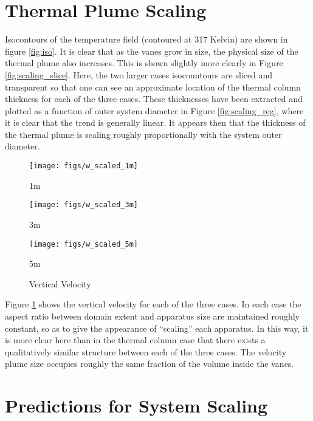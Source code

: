 \documentclass[english]{article}
\begin{document}
\section*{Thermal Plume Scaling}

Isocontours of the temperature field (contoured at 317 Kelvin) are shown in figure \ref{fig:iso}. 
It is clear that as the vanes grow in size, the physical size of the thermal plume also increases. This is shown slightly more clearly in
 Figure \ref{fig:scaling_slice}. Here, the two larger cases isocountours are sliced and transparent so that one can see an approximate 
location of the thermal column thickness for each of the three cases. These thicknesses have been extracted and plotted as a 
function of outer system diameter in Figure \ref{fig:scaling_reg}, where it is clear that the trend is generally linear. It appears then that 
the thickness of the thermal plume is scaling roughly proportionally with the system outer diameter. 

%
%


\begin{figure}[!htb]
\texttt{[image: figs/w\_scaled\_1m]}
\caption*{1m}\label{fig:1m_vz}
\endminipage\hfill
{}
\texttt{[image: figs/w\_scaled\_3m]}
\caption*{3m}\label{fig:3m_vz}
\endminipage\hfill
{}%
\texttt{[image: figs/w\_scaled\_5m]}
  \caption*{5m}\label{fig:5m_vz}
\endminipage
\caption{Vertical Velocity}
\label{fig:vz_scaling}
\end{figure}
 
Figure \ref{fig:vz_scaling} shows the vertical velocity for each of the three cases. In each case the aspect ratio between domain extent
and apparatus size are maintained roughly constant, so as to give the appearance of ``scaling'' each apparatus. In this way, it is more 
clear here than in the thermal column case that there exists a qualitatively similar structure between each of the three cases. The velocity plume 
size occupies roughly the same fraction of the volume inside the vanes. 

%
%
%
\section*{Predictions for System Scaling}

\end{document}
